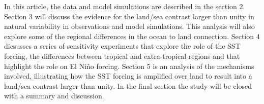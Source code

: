 In this article, the data and model simulations are described in the section 
2. Section 3 will discuss the evidence for the land/sea contrast larger than
unity in natural variability in observations and model simulations. This 
analysis will also explore some of the regional differences in the ocean to land 
connection. Section 4 dicsusses a series of sensitivity experiments that explore 
the role of the SST forcing, the differences between tropical and extra-tropical 
regions and that highlight the role on El Ni{\~n}o forcing.  Section 5 is an 
analysis of the mechanisms involved, illustrating how the SST forcing is 
amplified over land to result into a land/sea contrast larger than unity. In the 
final section the study will be closed with a summary and discussion.
